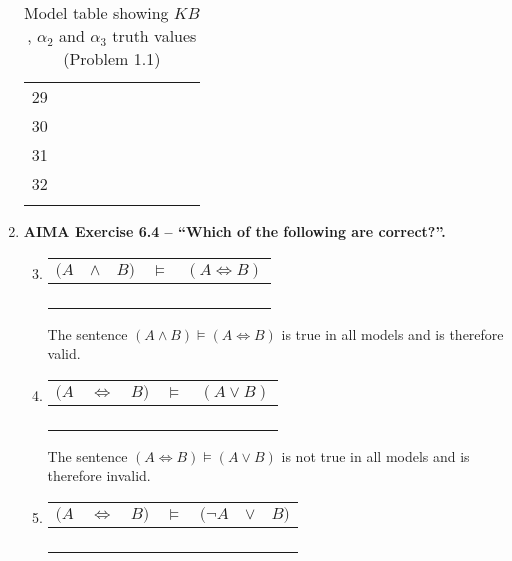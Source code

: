 \begin{enumerate}
\begin{longtable}[c]{c|cccccc|cc|c}
29	  & \T        & \F        & \F        & \T        & \F        & \F        & \T         & \T         & \F   \\
30	  & \T        & \F        & \F        & \T        & \F        & \T        & \T         & \T         & \F   \\
31	  & \T        & \F        & \F        & \T        & \T        & \F        & \F         & \T         & \F   \\
32	  & \T        & \F        & \F        & \T        & \T        & \T        & \F         & \T         & \F   \\
\caption{Model table showing $KB$, $\alpha_2$ and $\alpha_3$ truth values (Problem 1.1)}
\label{table:wompus_truths}
\end{longtable}

\item \textbf{AIMA Exercise 6.4 -- ``Which of the following are correct?''.}

\begin{enumerate}
\setcounter{enumii}{2}

\item 
\begin{tabular}{ccc|c|c}
$(A$ & $\land$ & $B)$ & $\vDash$ & $(A \Leftrightarrow B)$\\
\hline
\F & \F & \F & \T & \T \\
\F & \F & \T & \T & \F \\
\T & \F & \F & \T & \F \\
\T & \T & \T & \T & \T \\
\end{tabular}

The sentence $(A \land B) \vDash (A \Leftrightarrow B)$ is true in all models and is therefore valid.

\item
\begin{tabular}{ccc|c|c}
$(A$ & $\Leftrightarrow$ & $B)$ & $\vDash$ & $(A \lor B)$ \\
\hline
\F & \T & \F & \F & \F \\
\F & \F & \T & \T & \T \\
\T & \F & \F & \T & \T \\
\T & \T & \T & \T & \T \\
\end{tabular}

The sentence $(A \Leftrightarrow B) \vDash (A \lor B)$ is not true in all models and is therefore invalid.

\item
\begin{tabular}{ccc|c|ccc}
$(A$ & $\Leftrightarrow$ & $B)$ & $\vDash$ & $(\neg A$ & $\lor$ & $B)$ \\
\hline
\F & \T & \F & \T & \T & \T & \F \\
\F & \F & \T & \T & \T & \T & \T \\
\T & \F & \F & \T & \F & \F & \F \\
\T & \T & \T & \T & \F & \T & \T \\
\end{tabular}


\end{enumerate}
\end{enumerate}
